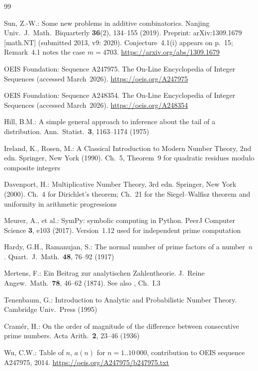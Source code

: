 \documentclass[pdflatex,sn-mathphys-num,Numbered]{sn-jnl}
\theoremstyle{thmstyleone}
\theoremstyle{thmstylethree}
\theoremstyle{thmstyletwo}
\numberwithin{equation}{section}
\begin{document}
\begin{thebibliography}{99}

	Sun, Z.-W.:
	Some new problems in additive combinatorics.
	Nanjing Univ.\ J.\ Math.\ Biquarterly \textbf{36}(2), 134--155
	(2019).
	Preprint: arXiv:1309.1679 [math.NT] (submitted 2013, v9: 2020).
	Conjecture~4.1(i) appears on p.~15; Remark~4.1 notes the case
	$m = 4703$.
	\url{https://arxiv.org/abs/1309.1679}

	OEIS Foundation:
	Sequence A247975.
	The On-Line Encyclopedia of Integer Sequences
	(accessed March~2026).
	\url{https://oeis.org/A247975}

	OEIS Foundation:
	Sequence A248354.
	The On-Line Encyclopedia of Integer Sequences
	(accessed March~2026).
	\url{https://oeis.org/A248354}

	Hill, B.M.:
	A simple general approach to inference about the tail of a
	distribution.
	Ann.\ Statist.\ \textbf{3}, 1163--1174 (1975)

	Ireland, K., Rosen, M.:
	A Classical Introduction to Modern Number Theory,
	2nd edn. Springer, New York (1990).
	Ch.~5, Theorem~9 for quadratic residues modulo composite integers

	Davenport, H.:
	Multiplicative Number Theory,
	3rd edn. Springer, New York (2000).
	Ch.~4 for Dirichlet's theorem; Ch.~21 for the Siegel--Walfisz
	theorem and uniformity in arithmetic progressions

	Meurer, A., et al.:
	SymPy: symbolic computing in Python.
	PeerJ Computer Science \textbf{3}, e103 (2017).
	Version~1.12 used for independent prime computation

	Hardy, G.H., Ramanujan, S.:
	The normal number of prime factors of a number~$n$.
	Quart.\ J.\ Math.\ \textbf{48}, 76--92 (1917)

	Mertens, F.:
	Ein Beitrag zur analytischen Zahlentheorie.
	J.\ Reine Angew.\ Math.\ \textbf{78}, 46--62 (1874).
	See also \cite{Tenenbaum1995}, Ch.~I.3

	Tenenbaum, G.:
	Introduction to Analytic and Probabilistic Number Theory.
	Cambridge Univ.\ Press (1995)

	Cram\'er, H.:
	On the order of magnitude of the difference between consecutive
	prime numbers.
	Acta Arith.\ \textbf{2}, 23--46 (1936)

	Wu, C.W.:
	Table of $n$, $a(n)$ for $n = 1..10\,000$,
	contribution to OEIS sequence A247975, 2014.
	\url{https://oeis.org/A247975/b247975.txt}


\end{thebibliography}
\end{document}
